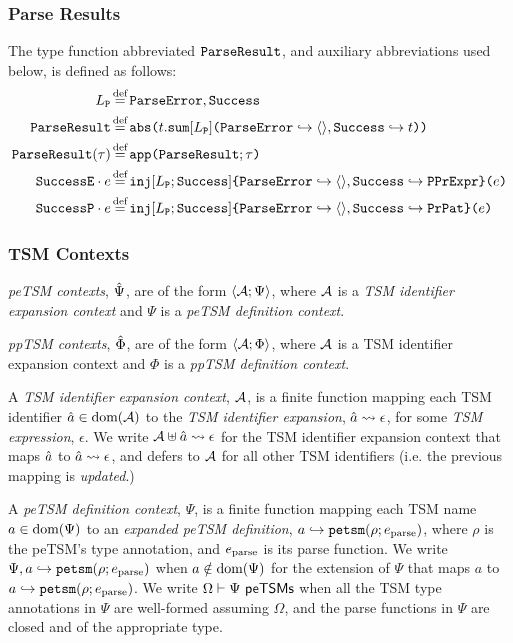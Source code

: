 \subsubsection{Parse Results}
 The type function abbreviated $\mathtt{ParseResult}$, and auxiliary abbreviations used below, is defined as follows:
\begin{align*}
L_\mathtt{P} & \defeq \lbltxt{ParseError}, \lbltxt{Success}\\
\tParseResultF & \defeq \acabs{t}{\asum{L_\mathtt{P}}{
  \mapitem{\lbltxt{ParseError}}{\prodt{}}, 
  \mapitem{\lbltxt{Success}}{t}
}}\\
\tParseResult{\tau} & \defeq \acapp{\tParseResultF}{\tau}\\
\lbltxt{SuccessE}\cdot e & \defeq \aein{L_\mathtt{P}}{\mathtt{Success}}{\mapitem{\mathtt{ParseError}}{\tpl{}}, \mapitem{\mathtt{Success}}{\tPProtoExpr}}{e}\\
\lbltxt{SuccessP}\cdot e & \defeq \aein{L_\mathtt{P}}{\mathtt{Success}}{\mapitem{\mathtt{ParseError}}{\tpl{}}, \mapitem{\mathtt{Success}}{\tCEPat}}{e}
\end{align*} %

\subsubsection{TSM Contexts}
\emph{peTSM contexts}, $\hat{\Psi}$, are of the form $\langle \mathcal{A}; \Psi \rangle$, where $\mathcal{A}$ is a \emph{TSM identifier expansion context} and $\Psi$ is a \emph{peTSM definition context}.

\emph{ppTSM contexts}, $\hat\Phi$, are of the form $\langle \mathcal{A}; \Phi \rangle$, where $\mathcal{A}$ is a TSM identifier expansion context and $\Phi$ is a \emph{ppTSM definition context}.

A \emph{TSM identifier expansion context}, $\mathcal{A}$, is a finite function mapping each TSM identifier $\hat{a} \in \text{dom}(\mathcal{A})$ to the \emph{TSM identifier expansion}, $\hat{a} \leadsto \epsilon$, for some \emph{TSM expression}, $\epsilon$. We write $\mathcal{A} \uplus \hat{a} \leadsto \epsilon$ for the TSM identifier expansion context that maps $\hat{a}$ to $\hat{a} \leadsto \epsilon$, and defers to $\mathcal{A}$ for all other TSM identifiers (i.e. the previous mapping is \emph{updated}.)

A \emph{peTSM definition context}, $\Psi$, is a finite function mapping each TSM name $a \in \text{dom}(\Psi)$ to an \emph{expanded peTSM definition}, $a \hookrightarrow \texttt{petsm}(\rho; e_\text{parse})$, where $\rho$ is the peTSM's type annotation, and $e_\text{parse}$ is its parse function. We write $\Psi, a \hookrightarrow \texttt{petsm}(\rho; e_\text{parse})$ when $a \notin \text{dom}(\Psi)$ for the extension of $\Psi$ that maps $a$ to $a \hookrightarrow \texttt{petsm}(\rho; e_\text{parse})$. We write $\Omega \vdash \Psi~\mathsf{peTSMs}$  when all the TSM type annotations in $\Psi$ are well-formed assuming $\Omega$, and the parse functions in $\Psi$ are closed and of the appropriate type.


